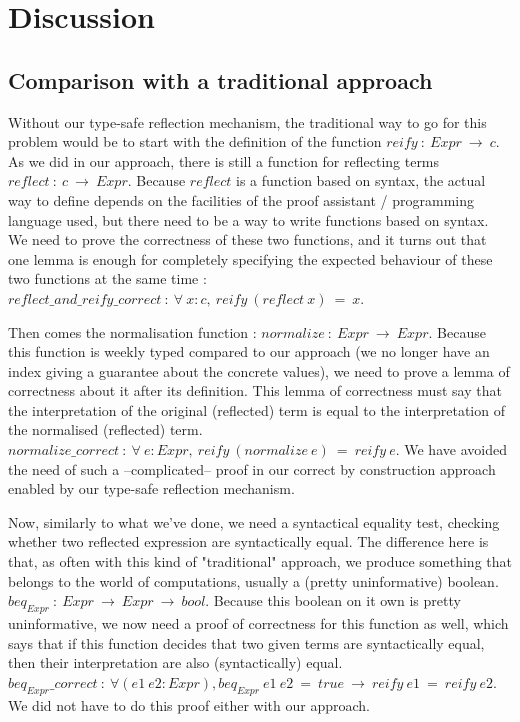 \section {Discussion}

	\subsection{Comparison with a traditional approach}

Without our type-safe reflection mechanism, the traditional way to go for this problem would be to start with the definition of the function $reify\ :\ Expr\ \rightarrow\ c$. As we did in our approach, there is still a function for reflecting terms $reflect\ :\ c\ \rightarrow\ Expr$. Because $reflect$ is a function based on syntax,  the actual way to define depends on the facilities of the proof assistant / programming language used, but there need to be a way to write functions based on syntax. We need to prove the correctness of these two functions, and it turns out that one lemma is enough for completely specifying the expected behaviour of these two functions at the same time : $reflect\_and\_reify\_correct\ :\ \forall\ x:c,\ reify\ (reflect\ x)\ =\ x$.

Then comes the normalisation function : $normalize\ :\ Expr\ \rightarrow\ Expr$. Because this function is weekly typed compared to our approach (we no longer have an index giving a guarantee about the concrete values), we need to prove a lemma of correctness about it after its definition. This lemma of correctness must say that the interpretation of the original (reflected) term is equal to the interpretation of the normalised (reflected) term. $normalize\_correct\ :\ \forall\ e:Expr,\ reify\ (normalize\ e)\ =\ reify\ e$. We have avoided the need of such a --complicated-- proof in our correct by construction approach enabled by our type-safe reflection mechanism.

Now, similarly to what we've done, we need a syntactical equality test, checking whether two reflected expression are syntactically equal. The difference here is that, as often with this kind of "traditional" approach, we produce something that belongs to the world of computations, usually a (pretty uninformative) boolean.
$beq_{Expr}\ :\ Expr\ \rightarrow\ Expr\ \rightarrow\ bool$. Because this boolean on it own is pretty uninformative, we now need a proof of correctness for this function as well, which says that if this function decides that two given terms are syntactically equal, then their interpretation are also (syntactically) equal. $beq_{Expr}\_correct\ :\ \forall (e1\ e2:Expr), beq_{Expr}\ e1\ e2\ =\ true\ \rightarrow\ reify\ e1\ =\ reify\ e2$. We did not have to do this proof either with our approach.

